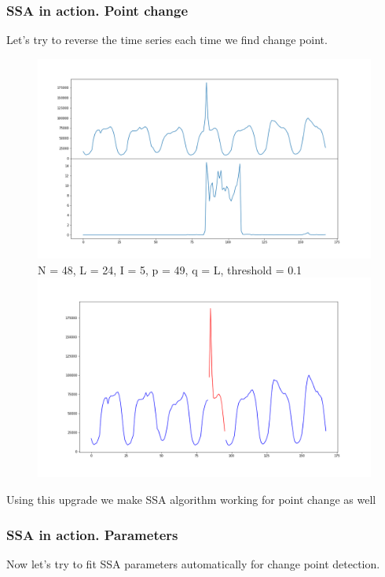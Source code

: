 \documentclass[intlimits, 9pt, unicode]{beamer}
\begin{document}
\begin{frame}
    \frametitle{SSA in action. Point change}
    
Let's try to reverse the time series each time we find change point.

\begin{figure}
	\includegraphics[scale=0.10]{images/023_point_cp_2}
	N = 48, L = 24, I = 5, p = 49, q = L, threshold = 0.1
	\includegraphics[scale=0.10]{images/024_point_cp_detected_2}
\end{figure}

Using this upgrade we make SSA algorithm working for point change as well

\end{frame}


\begin{frame}
    \frametitle{SSA in action. Parameters}
    
Now let's try to fit SSA parameters automatically for change point detection.

\end{frame}
\end{document}
